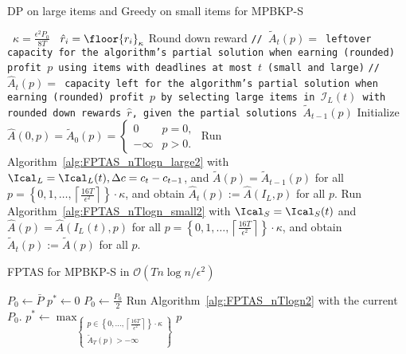 \documentclass[11pt]{article}
\begin{document}
\begin{algorithm}[ht]
\footnotesize
\caption{DP on large items and Greedy on small items for MPBKP-S}
\label{alg:FPTAS_nTlogn2}
\begin{algorithmic}[1]
	\Define \ $\kappa = \frac{\epsilon^2 P_0 }{8T}$
	\Define \ $\hat{r}_i = \floor{ {r_i} }_\kappa$ \Comment Round down reward
	\Statex  \texttt{// $\widetilde{A}_t(p)=$ leftover capacity for the algorithm's partial solution when earning (rounded) profit $p$ using items with deadlines at most $t$ (small and large)} %
	\Statex  \texttt{// $\hat{A}_t(p)=$ capacity left for the algorithm's partial solution when earning (rounded) profit $p$ by selecting large items in $\mathcal{I}_L(t)$ with rounded down rewards $\hat{r}$, given the partial solutions $\widetilde{A}_{t-1}(p)$}
	\State Initialize $\hat{A}(0,p) = \widetilde{A}_0(p) = \begin{cases}
	0 & p = 0,\\
	-\infty & p > 0.
	\end{cases}$
	\State Run Algorithm~\ref{alg:FPTAS_nTlogn_large2} with $\Ical_L = \Ical_L(t), \Delta c = c_t - c_{t-1}$, and $\widetilde{A}(p)=\widetilde{A}_{t-1}(p)$ for all $p = \left\{ 0, 1, \ldots,\left\lceil\frac{16T}{\epsilon^2}\right\rceil \right\} \cdot \kappa $, and obtain $\hat{A}_t(p):= \hat{A}(I_L,p)$ for all $p$.
	\State Run Algorithm~\ref{alg:FPTAS_nTlogn_small2} with $\Ical_S=\Ical_S(t)$ and $\hat{A}(p) = \hat{A}(I_L(t),p)$ for all $p = \left\{ 0, 1, \ldots,\left\lceil\frac{16T}{\epsilon^2}\right\rceil \right\} \cdot \kappa $, and obtain $\widetilde{A}_{t}(p):=\widetilde{A}(p)$ for all $p$.
	\EndFor
\end{algorithmic}
\end{algorithm}

\begin{algorithm}[ht]
\footnotesize
\caption{FPTAS for MPBKP-S in $\mathcal{O}(Tn\log n/\epsilon^2)$}
\label{alg:SC_FPTAS}
\begin{algorithmic}[1]
	\State $P_0\gets {\bar{P}}$
	\State $p^*\gets 0$
	\vspace{0.1cm}
	\State $P_0\gets \frac{P_0}{2}$
	\vspace{0.1cm}
	\State	Run Algorithm~\ref{alg:FPTAS_nTlogn2} with the current $P_0$.
	\State $p^*\gets \max_{\left\{\substack{p\in \left\{ 0,\ldots,\left\lceil\frac{16T}{\epsilon^2}\right\rceil \right\} \cdot \kappa\\ \widetilde{A}_T(p)> -\infty}\right\}}p$
	\EndWhile
\end{algorithmic}
\end{algorithm}
\end{document}
